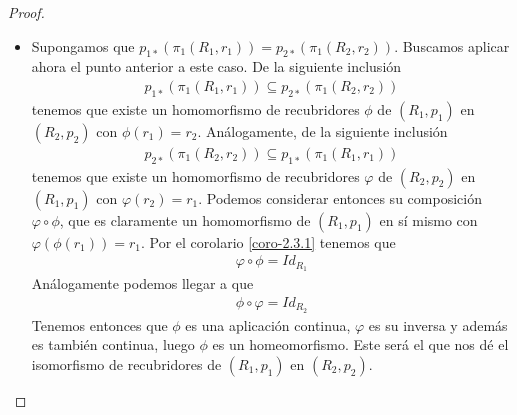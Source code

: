 \begin{coro}
\begin{proof}
\begin{enumerate}
\begin{itemize}
                \item[$\Leftarrow$)] Supongamos que $p_{1*}(\pi_1(R_1,r_1)) = p_{2*}(\pi_1(R_2,r_2))$. Buscamos aplicar ahora el punto anterior a este caso. De la siguiente inclusión
                \begin{gather*}
                    p_{1*}(\pi_1(R_1,r_1)) \subseteq p_{2*}(\pi_1(R_2,r_2))
                \end{gather*}
                tenemos que existe un homomorfismo de recubridores $\phi$ de $(R_1,p_1)$ en $(R_2,p_2)$ con $\phi(r_1)=r_2$. Análogamente, de la siguiente inclusión  
                \begin{gather*}
                    p_{2*}(\pi_1(R_2,r_2)) \subseteq p_{1*}(\pi_1(R_1,r_1))
                \end{gather*}
                tenemos que existe un homomorfismo de recubridores $\varphi$ de $(R_2,p_2)$ en $(R_1,p_1)$ con $\varphi(r_2)=r_1$. Podemos considerar entonces su composición $\varphi \circ \phi$, que es claramente un homomorfismo de $(R_1,p_1)$ en sí mismo con $\varphi(\phi(r_1)) = r_1$. Por el corolario \ref{coro-2.3.1} tenemos que 
                \begin{gather*}
                    \varphi \circ \phi = Id_{R_1}
                \end{gather*}
                Análogamente podemos llegar a que
                \begin{gather*}
                    \phi \circ \varphi = Id_{R_2}
                \end{gather*}
                Tenemos entonces que $\phi$ es una aplicación continua, $\varphi$ es su inversa y además es también continua, luego $\phi$ es un homeomorfismo. Este será el que nos dé el isomorfismo de recubridores de $(R_1, p_1)$ en $(R_2, p_2)$.
            \end{itemize}

        \end{enumerate}
    \end{proof}
\end{coro}

